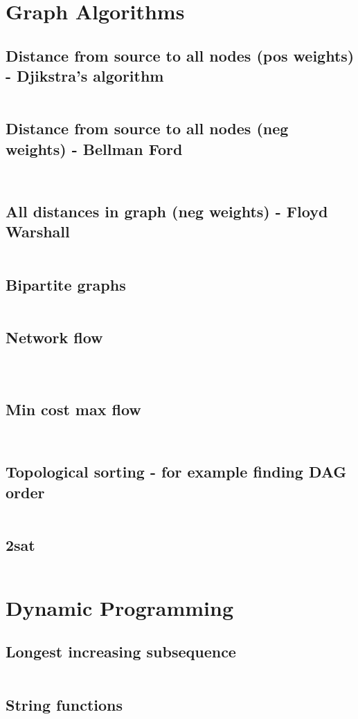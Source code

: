 \documentclass[8pt,a4paper,landscape,oneside]{amsart}
\newcommand{\codej}[1]{\inputminted[fontsize=\large,tabsize=2,baselinestretch=1]{java}{code/#1}}
\newcommand{\codec}[1]{\inputminted[fontsize=\large,tabsize=2,baselinestretch=1]{cpp}{code/#1}}
\newcommand{\codep}[1]{\inputminted[fontsize=\large,tabsize=2,baselinestretch=1]{py}{code/#1}}
\begin{document}
\begin{multicols*}{2}
\begin{large}
\section{Graph Algorithms}
\subsection{Distance from source to all nodes (pos weights) - Djikstra's algorithm}
\codep{djikstra.py}
\subsection{Distance from source to all nodes (neg weights) - Bellman Ford}
\codep{bellmanford.py}
\codec{bellmanford.cpp}
\subsection{All distances in graph (neg weights) - Floyd Warshall}
\codep{floydwarshall.py}
\subsection{Bipartite graphs}
\codec{kuhns.cpp}
\subsection{Network flow}
\codec{dinic.cpp}
\codep{maxflow.py}
\codep{maxflow2.py}
\subsection{Min cost max flow}
\codep{mincostmaxflow.py}
\codej{mincostmaxflow.cpp}
\subsection{Topological sorting - for example finding DAG order}
\codep{topsort.py}
\subsection{2sat}
\codec{2sat.cpp}
\section{Dynamic Programming}
\subsection{Longest increasing subsequence}
\codep{lis.py}
\subsection{String functions}
\codep{stringmatching.py}

\end{large}
\end{multicols*}
\end{document}

